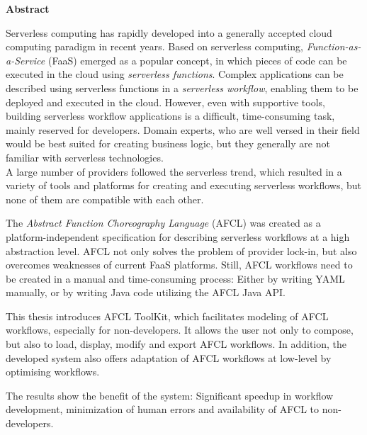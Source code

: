 \documentclass[a4paper,top=25mm,bottom=25mm,12pt,pdftex,halfparskip,twoside,openany,bibtotoc,numbers=noenddot]{scrbook}
\begin{document}


\clearpage



\clearpage

\thispagestyle{plain}

\vspace{2.5cm}
\begin{center}
\textbf{Abstract}
\end{center}

Serverless computing has rapidly developed into a generally accepted cloud computing paradigm in recent years.
Based on serverless computing, \textit{Function-as-a-Service} (FaaS) emerged as a popular concept, in which pieces of code can be executed in the cloud using \textit{serverless functions}. Complex applications can be described using serverless functions in a \textit{serverless workflow}, enabling them to be deployed and executed in the cloud.
However, even with supportive tools, building serverless workflow applications is a difficult, time-consuming task, mainly reserved for developers.
Domain experts, who are well versed in their field would be best suited for creating business logic, but they generally are not familiar with serverless technologies.\\
A large number of providers followed the serverless trend, which resulted in a variety of tools and platforms for creating and executing serverless workflows, but none of them are compatible with each other.

The \textit{Abstract Function Choreography Language} (AFCL) was created as a platform-independent specification for describing serverless workflows at a high abstraction level. AFCL not only solves the problem of provider lock-in, but also overcomes weaknesses of current FaaS platforms. Still, AFCL workflows need to be created in a manual and time-consuming process: Either by writing YAML manually, or by writing Java code utilizing the AFCL Java API.

This thesis introduces AFCL ToolKit, which facilitates modeling of AFCL workflows, especially for non-developers. It allows the user not only to compose, but also to load, display, modify and export AFCL workflows. In addition, the developed system also offers adaptation of AFCL workflows at low-level by optimising workflows.

The results show the benefit of the system: Significant speedup in workflow development, minimization of human errors and availability of AFCL to non-developers.
\end{document}
